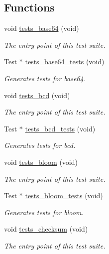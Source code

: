 \subsection*{Functions}
\begin{DoxyCompactItemize}
\item 
void \hyperlink{group__unittests_gad8db0d2b50c5b552f0173f6e55cc21b4}{tests\+\_\+base64} (void)
\begin{DoxyCompactList}\small\item\em The entry point of this test suite. \end{DoxyCompactList}\item 
Test $\ast$ \hyperlink{group__unittests_ga7104265274747d0e2711d4f44feb9362}{tests\+\_\+base64\+\_\+tests} (void)
\begin{DoxyCompactList}\small\item\em Generates tests for base64. \end{DoxyCompactList}\item 
void \hyperlink{group__unittests_ga743f1615d5742924d9f921a17fe159a6}{tests\+\_\+bcd} (void)
\begin{DoxyCompactList}\small\item\em The entry point of this test suite. \end{DoxyCompactList}\item 
Test $\ast$ \hyperlink{group__unittests_ga67d8fcec140a78689e78a00ba4b2582e}{tests\+\_\+bcd\+\_\+tests} (void)
\begin{DoxyCompactList}\small\item\em Generates tests for bcd. \end{DoxyCompactList}\item 
void \hyperlink{group__unittests_gabad6e976ec47aecf07c700f947206fdb}{tests\+\_\+bloom} (void)
\begin{DoxyCompactList}\small\item\em The entry point of this test suite. \end{DoxyCompactList}\item 
Test $\ast$ \hyperlink{group__unittests_gaaa23c5835dcd15e549fc6bf7227a928e}{tests\+\_\+bloom\+\_\+tests} (void)
\begin{DoxyCompactList}\small\item\em Generates tests for bloom. \end{DoxyCompactList}\item 
void \hyperlink{group__unittests_gae22a9f38219373678e7c27dbc0011406}{tests\+\_\+checksum} (void)
\begin{DoxyCompactList}\small\item\em The entry point of this test suite. \end{DoxyCompactList}\item 

\end{DoxyCompactItemize}
